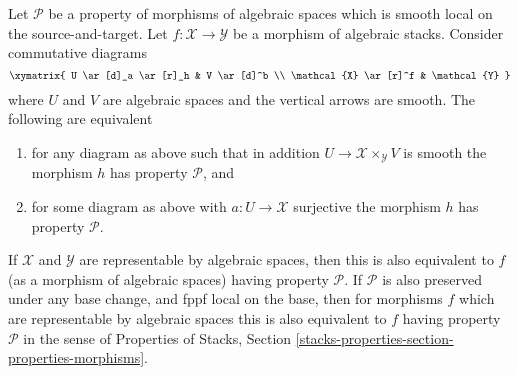 \begin{lemma}
\label{lemma-local-source-target}
Let $\mathcal{P}$ be a property of morphisms of algebraic spaces
which is smooth local on the source-and-target.
Let $f : \mathcal{X} \to \mathcal{Y}$ be a morphism of algebraic stacks.
Consider commutative diagrams
$$
\xymatrix{
U \ar[d]_a \ar[r]_h & V \ar[d]^b \\
\mathcal{X} \ar[r]^f & \mathcal{Y}
}
$$
where $U$ and $V$ are algebraic spaces and the vertical arrows are smooth.
The following are equivalent
\begin{enumerate}
\item for any diagram as above such that in addition
$U \to \mathcal{X} \times_\mathcal{Y} V$ is smooth
the morphism $h$ has property $\mathcal{P}$, and
\item for some diagram as above with $a : U \to \mathcal{X}$ surjective
the morphism $h$ has property $\mathcal{P}$.
\end{enumerate}
If $\mathcal{X}$ and $\mathcal{Y}$ are representable by algebraic spaces,
then this is also equivalent to $f$ (as a morphism of algebraic spaces)
having property $\mathcal{P}$. If $\mathcal{P}$ is also preserved under
any base change, and fppf local on the base, then for morphisms $f$
which are representable by algebraic spaces this
is also equivalent to $f$ having property $\mathcal{P}$ in the sense
of
Properties of Stacks,
Section \ref{stacks-properties-section-properties-morphisms}.
\end{lemma}

